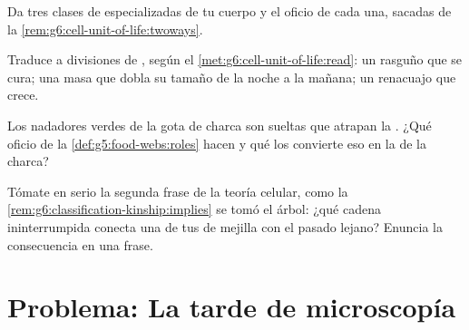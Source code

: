 \begin{exercise}[$\star\star$]\label{exo:g6:cell-unit-of-life:9}
Da tres clases de  especializadas de tu cuerpo y el oficio de
cada una, sacadas de la \cref{rem:g6:cell-unit-of-life:twoways}.
\end{exercise}

\begin{exercise}[$\star\star$]\label{exo:g6:cell-unit-of-life:10}
Traduce a divisiones de , según el
\cref{met:g6:cell-unit-of-life:read}: un rasguño que se cura; una masa
que dobla su tamaño de la noche a la mañana; un renacuajo que crece.
\end{exercise}

\begin{exercise}[$\star\star$]\label{exo:g6:cell-unit-of-life:11}
Los nadadores verdes de la gota de charca son  sueltas que
atrapan la . ¿Qué oficio de la \cref{def:g5:food-webs:roles} hacen y
qué los convierte eso en la  de la charca?
\end{exercise}

\begin{exercise}[$\star\star\star$]\label{exo:g6:cell-unit-of-life:12}
Tómate en serio la segunda frase de la teoría celular, como la
\cref{rem:g6:classification-kinship:implies} se tomó el árbol: ¿qué
cadena ininterrumpida conecta una de tus  de mejilla con el
pasado lejano? Enuncia la consecuencia en una frase.
\end{exercise}

\section{Problema: La tarde de microscopía}

